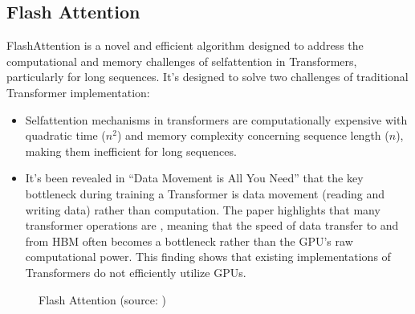 \documentclass[letterpaper,11pt,english]{sphinxmanual}
\begin{document}
\subsection{Flash Attention}
\label{\detokenize{pretraining:flash-attention}}
\sphinxAtStartPar
FlashAttention  is a novel and
efficient algorithm designed to address the computational and memory
challenges of self\sphinxhyphen{}attention in Transformers, particularly for long
sequences. It’s designed to solve two challenges of traditional
Transformer implementation:
\begin{itemize}
\item {} 
\sphinxAtStartPar
Self\sphinxhyphen{}attention mechanisms in transformers are computationally
expensive with quadratic time (\(n^2\)) and memory complexity
concerning sequence length (\(n\)), making them inefficient for
long sequences.

\item {} 
\sphinxAtStartPar
It’s been revealed in “Data Movement is All You Need”  that the
key bottleneck during training a Transformer is data movement (reading
and writing data) rather than computation. The paper highlights that
many transformer operations are , meaning
that the speed of data transfer to and from HBM often becomes a
bottleneck rather than the GPU’s raw computational power. This finding
shows that existing implementations of Transformers do not efficiently
utilize GPUs.

\end{itemize}

\begin{figure}[htbp]
\centering
\capstart

\noindent{}
\caption{Flash Attention (source: )}\label{\detokenize{pretraining:id22}}\end{figure}
\end{document}
